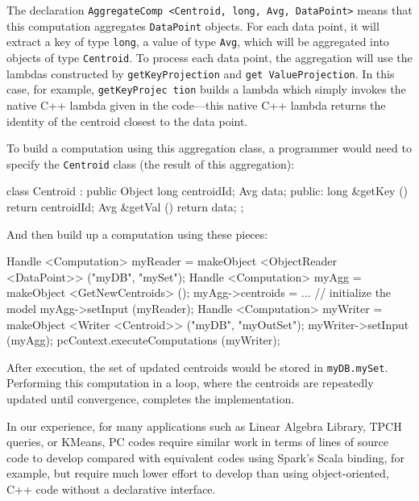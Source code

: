 {\noindent 
The declaration \texttt{AggregateComp <Centroid, long, Avg, DataPoint>} means that this computation aggregates
\texttt{DataPoint} objects.  For each data point, it will extract a key of type \texttt{long}, a value of type \texttt{Avg}, which will be
aggregated into objects of type \texttt{Centroid}.  To process each data point, the aggregation will use the lambdas constructed by
\texttt{getKeyProjection} and \texttt{get ValueProjection}.  
In this case, for example,
\texttt{getKeyProjec tion} builds a lambda which simply invokes the native C++ lambda given in the code---this
native C++ lambda returns the identity of the centroid closest to the data point.

To build a computation using this aggregation class, a programmer would need to specify the \texttt{Centroid} class (the result of this aggregation):

\begin{codesmall}
class Centroid : public Object {
	long centroidId; 
	Avg data;
public:
	long &getKey () {return centroidId;}
	Avg &getVal () {return data;}
};
\end{codesmall}

\noindent
And then build up a computation using these pieces:

\begin{codesmall}
Handle <Computation> myReader = 
    makeObject <ObjectReader <DataPoint>>
     ("myDB", "mySet");
Handle <Computation> myAgg = makeObject 
    <GetNewCentroids> ();
myAgg->centroids = ... // initialize the model
myAgg->setInput (myReader);
Handle <Computation> myWriter =  makeObject <Writer
     <Centroid>> ("myDB", "myOutSet");
    myWriter->setInput (myAgg);
pcContext.executeComputations (myWriter);
\end{codesmall}

\noindent After execution, the set of updated centroids would be stored in \texttt{myDB.mySet}.
Performing this computation in a loop, where the centroids are repeatedly updated until convergence, completes the implementation.


In our experience, for many applications such as Linear Algebra
Library, TPCH queries, or KMeans, PC codes require similar work in
terms of lines of source code to develop compared with equivalent codes using Spark's Scala binding, for
example, but require much lower effort to develop than using
object-oriented, C++ code without a declarative interface.

}

